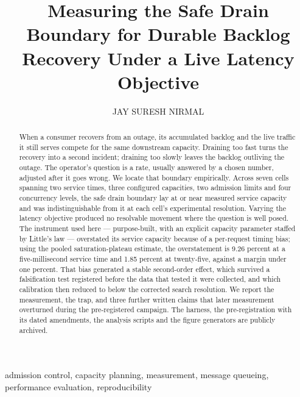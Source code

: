 \documentclass{ieeeaccess}
\begin{document}
\title{Measuring the Safe Drain Boundary for Durable Backlog Recovery Under a Live Latency Objective}
\author{\uppercase{Jay Suresh Nirmal}}
\address[1]{Independent Researcher, Boston, MA, USA (e-mail: jaynirmal15@gmail.com; ORCID: 0009-0003-0886-4663)}

\begin{abstract}
When a consumer recovers from an outage, its accumulated backlog and the live traffic it still serves compete for the same downstream capacity. Draining too fast turns the recovery into a second incident; draining too slowly leaves the backlog outliving the outage. The operator's question is a rate, usually answered by a chosen number, adjusted after it goes wrong. We locate that boundary empirically. Across seven cells spanning two service times, three configured capacities, two admission limits and four concurrency levels, the safe drain boundary lay at or near measured service capacity and was indistinguishable from it at each cell's experimental resolution. Varying the latency objective produced no resolvable movement where the question is well posed. The instrument used here --- purpose-built, with an explicit capacity parameter staffed by Little's law --- overstated its service capacity because of a per-request timing bias; using the pooled saturation-plateau estimate, the overstatement is 9.26 percent at a five-millisecond service time and 1.85 percent at twenty-five, against a margin under one percent. That bias generated a stable second-order effect, which survived a falsification test registered before the data that tested it were collected, and which calibration then reduced to below the corrected search resolution. We report the measurement, the trap, and three further written claims that later measurement overturned during the pre-registered campaign. The harness, the pre-registration with its dated amendments, the analysis scripts and the figure generators are publicly archived.
\end{abstract}

\begin{IEEEkeywords}
admission control, capacity planning, measurement, message queueing, performance evaluation, reproducibility
\end{IEEEkeywords}
\end{document}
